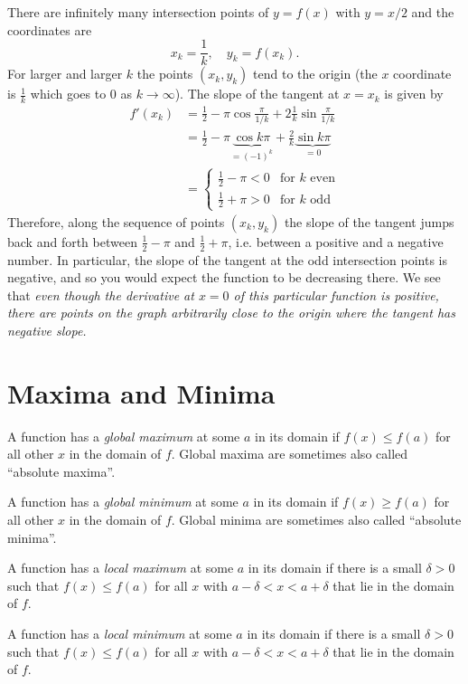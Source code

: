There are infinitely many intersection points of $y=f(x)$ with $y=x/2$ and the coordinates are
\[
x_k= \frac1k,\quad y_k= f(x_k).
\]
For larger and larger $k$ the points $(x_k, y_k)$ tend to the origin (the $x$
coordinate is $\frac1k$ which goes to 0 as $k\to\infty$).  The slope of the
tangent at $x=x_k$ is given by
\begin{align*}
  f'(x_k) &= \frac12-\pi\cos\frac\pi{1/k} +2\frac1k\sin\frac\pi{1/k}\\
  &= \frac12-\pi \underbrace{\cos k\pi}_{=(-1)^k} +\frac2k
  \underbrace{\sin k\pi}_{=0}\\
  &=\begin{cases}
    \frac12-\pi<0 & \text{for $k$ even}\\[4pt]
    \frac12+\pi>0 & \text{for $k$ odd}
  \end{cases}
\end{align*}
Therefore, along the sequence of points $(x_k, y_k)$ the slope of the tangent
jumps back and forth between $\frac12-\pi$ and $\frac12+\pi$, i.e. between a
positive and a negative number.
In particular, the slope of the tangent at the odd intersection points is
negative, and so you would expect the function to be decreasing there.  
We see that \textit{even though the derivative at $x=0$ of this
particular function is positive, there are points on the graph arbitrarily close
to the origin where the tangent has negative slope.}








\section{Maxima and Minima} %
A function has a \emph{global maximum} at some $a$ in its domain if $f(x)\leq
f(a)$ for all other $x$ in the domain of $f$.  Global maxima are sometimes also
called ``absolute maxima''.
  
A function has a \emph{global minimum} at some $a$ in its domain if $f(x)\geq
f(a)$ for all other $x$ in the domain of $f$.  Global minima are sometimes also
called ``absolute minima''.




A function has a \emph{local maximum} at some $a$ in its domain if
there is a small $\delta>0$ such that $f(x)\leq f(a)$ for all $x$ with
$a-\delta<x<a+\delta$ that lie in the domain of $f$.
  
A function has a \emph{local minimum} at some $a$ in its domain if
there is a small $\delta>0$ such that $f(x)\leq f(a)$ for all $x$ with
$a-\delta<x<a+\delta$ that lie in the domain of $f$.




